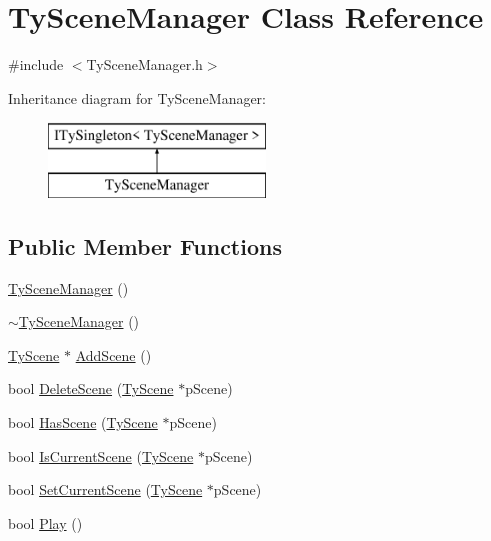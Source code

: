 \hypertarget{class_ty_scene_manager}{
\section{TySceneManager Class Reference}
\label{class_ty_scene_manager}
}


{\ttfamily \#include $<$TySceneManager.h$>$}

Inheritance diagram for TySceneManager:\begin{figure}[H]
\begin{center}
\leavevmode
\includegraphics[height=2.000000cm]{class_ty_scene_manager}
\end{center}
\end{figure}
\subsection*{Public Member Functions}
\begin{DoxyCompactItemize}
\item 
\hyperlink{class_ty_scene_manager_ad6570e69986f66f4b63b9777d21d9c17}{TySceneManager} ()
\item 
\hyperlink{class_ty_scene_manager_a1553d9184cdba8a12a393adf21a69179}{$\sim$TySceneManager} ()
\item 
\hyperlink{class_ty_scene}{TyScene} $\ast$ \hyperlink{class_ty_scene_manager_ab5afdf518526578d77b16471d5e3bd57}{AddScene} ()
\item 
bool \hyperlink{class_ty_scene_manager_ae12fa166271d8b314e9069f284338865}{DeleteScene} (\hyperlink{class_ty_scene}{TyScene} $\ast$pScene)
\item 
bool \hyperlink{class_ty_scene_manager_a821e72b211864431bcdb9460e2c4d7db}{HasScene} (\hyperlink{class_ty_scene}{TyScene} $\ast$pScene)
\item 
bool \hyperlink{class_ty_scene_manager_a1cfd00947c258f9884c39f515038164c}{IsCurrentScene} (\hyperlink{class_ty_scene}{TyScene} $\ast$pScene)
\item 
bool \hyperlink{class_ty_scene_manager_a0daf4b4e0904396be43193c9eab6f457}{SetCurrentScene} (\hyperlink{class_ty_scene}{TyScene} $\ast$pScene)
\item 
bool \hyperlink{class_ty_scene_manager_af43ec1e930a329d45ed24294c56e5a9c}{Play} ()
\end{DoxyCompactItemize}


